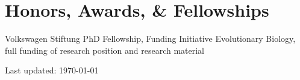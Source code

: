 \documentclass[10pt,letterpaper]{article}
\renewenvironment{itemize}{
  \begin{list}{}{
    \setlength{\leftmargin}{1.5em}
    \setlength{\itemsep}{0.25em}
    \setlength{\parskip}{0pt}
    \setlength{\parsep}{0.25em}
  }
}{
  \end{list}
}
\begin{document}



\section*{Honors, Awards, \& Fellowships}

\begin{itemize}
\item [2008] Volkswagen Stiftung PhD Fellowship, Funding Initiative
  Evolutionary Biology, full funding of research position and research
  material
\end{itemize}



\begin{center}
  \begin{small}
    Last updated: \today
  \end{small}
\end{center}
\end{document}
